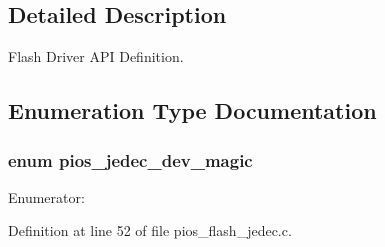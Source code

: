 \subsection{\-Detailed \-Description}
\-Flash \-Driver \-A\-P\-I \-Definition. 

\subsection{\-Enumeration \-Type \-Documentation}
\hypertarget{group___p_i_o_s___f_l_a_s_h_ga3e7c01370e9757b84f3a37ec903714f3}{
\subsubsection[{pios\-\_\-jedec\-\_\-dev\-\_\-magic}]{\setlength{\rightskip}{0pt plus 5cm}enum {\bf pios\-\_\-jedec\-\_\-dev\-\_\-magic}}}\label{group___p_i_o_s___f_l_a_s_h_ga3e7c01370e9757b84f3a37ec903714f3}
\begin{Desc}
\item[\-Enumerator\-: ]\par
\begin{description}
\item[{\em 
\hypertarget{group___p_i_o_s___f_l_a_s_h_gga3e7c01370e9757b84f3a37ec903714f3a6360375c9264a236124eccd65cf3e519}{\-P\-I\-O\-S\-\_\-\-J\-E\-D\-E\-C\-\_\-\-D\-E\-V\-\_\-\-M\-A\-G\-I\-C}\label{group___p_i_o_s___f_l_a_s_h_gga3e7c01370e9757b84f3a37ec903714f3a6360375c9264a236124eccd65cf3e519}
}]\end{description}
\end{Desc}



\-Definition at line 52 of file pios\-\_\-flash\-\_\-jedec.\-c.



